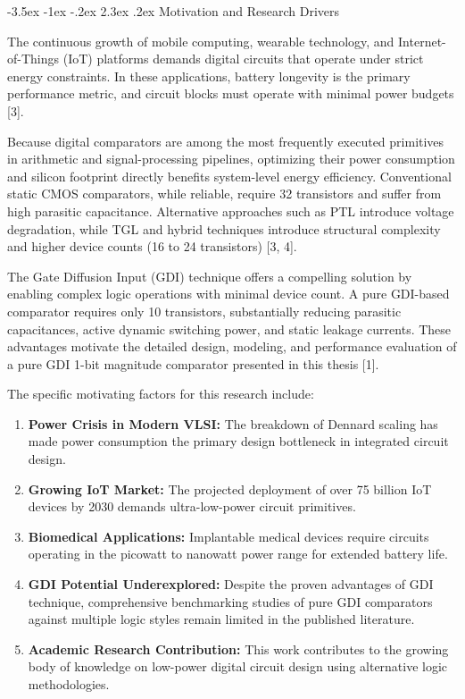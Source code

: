 \documentclass[12pt,a4paper,oneside]{report}
\makeatletter
\renewcommand\section{\@startsection {section}{1}{\z@}%
                                   {-3.5ex \@plus -1ex \@minus -.2ex}%
                                   {2.3ex \@plus.2ex}%
                                   {\normalfont\normalsize\bfseries}}
\makeatother
\begin{document}
\section{Motivation and Research Drivers}

The continuous growth of mobile computing, wearable technology, and Internet-of-Things (IoT) platforms demands digital circuits that operate under strict energy constraints. In these applications, battery longevity is the primary performance metric, and circuit blocks must operate with minimal power budgets [3].

Because digital comparators are among the most frequently executed primitives in arithmetic and signal-processing pipelines, optimizing their power consumption and silicon footprint directly benefits system-level energy efficiency. Conventional static CMOS comparators, while reliable, require 32 transistors and suffer from high parasitic capacitance. Alternative approaches such as PTL introduce voltage degradation, while TGL and hybrid techniques introduce structural complexity and higher device counts (16 to 24 transistors) [3, 4].

The Gate Diffusion Input (GDI) technique offers a compelling solution by enabling complex logic operations with minimal device count. A pure GDI-based comparator requires only 10 transistors, substantially reducing parasitic capacitances, active dynamic switching power, and static leakage currents. These advantages motivate the detailed design, modeling, and performance evaluation of a pure GDI 1-bit magnitude comparator presented in this thesis [1].

The specific motivating factors for this research include:
\begin{enumerate}
\item \textbf{Power Crisis in Modern VLSI:} The breakdown of Dennard scaling has made power consumption the primary design bottleneck in integrated circuit design.
\item \textbf{Growing IoT Market:} The projected deployment of over 75 billion IoT devices by 2030 demands ultra-low-power circuit primitives.
\item \textbf{Biomedical Applications:} Implantable medical devices require circuits operating in the picowatt to nanowatt power range for extended battery life.
\item \textbf{GDI Potential Underexplored:} Despite the proven advantages of GDI technique, comprehensive benchmarking studies of pure GDI comparators against multiple logic styles remain limited in the published literature.
\item \textbf{Academic Research Contribution:} This work contributes to the growing body of knowledge on low-power digital circuit design using alternative logic methodologies.
\end{enumerate}
\end{document}

